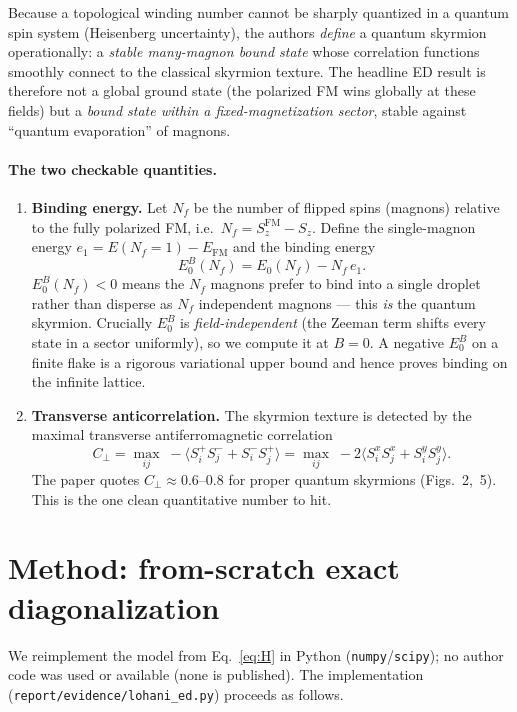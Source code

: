 \documentclass[11pt]{article}
\newcommand{\Cperp}{C_{\perp}}
\begin{document}
Because a topological winding number cannot be sharply quantized in a quantum spin system
(Heisenberg uncertainty), the authors \emph{define} a quantum skyrmion operationally: a
\emph{stable many-magnon bound state} whose correlation functions smoothly connect to the classical
skyrmion texture. The headline ED result is therefore not a global ground state (the polarized FM
wins globally at these fields) but a \emph{bound state within a fixed-magnetization sector},
stable against ``quantum evaporation'' of magnons.

\paragraph{The two checkable quantities.}
\begin{enumerate}
\item \textbf{Binding energy.} Let $N_f$ be the number of flipped spins (magnons) relative to the
fully polarized FM, i.e.\ $N_f = S_z^{\mathrm{FM}} - S_z$. Define the single-magnon energy
$e_1 = E(N_f{=}1) - E_{\mathrm{FM}}$ and the binding energy
\begin{equation}
E_0^B(N_f) = E_0(N_f) - N_f\, e_1 .
\label{eq:binding}
\end{equation}
$E_0^B(N_f)<0$ means the $N_f$ magnons prefer to bind into a single droplet rather than disperse
as $N_f$ independent magnons --- this \emph{is} the quantum skyrmion. Crucially $E_0^B$ is
\emph{field-independent} (the Zeeman term shifts every state in a sector uniformly), so we compute
it at $B=0$. A negative $E_0^B$ on a finite flake is a rigorous variational upper bound and hence
proves binding on the infinite lattice.
\item \textbf{Transverse anticorrelation.} The skyrmion texture is detected by the maximal
transverse antiferromagnetic correlation
\begin{equation}
\Cperp = \max_{ij}\; -\big\langle S_i^+ S_j^- + S_i^- S_j^+\big\rangle
       = \max_{ij}\; -2\big\langle S_i^x S_j^x + S_i^y S_j^y\big\rangle .
\label{eq:cperp}
\end{equation}
The paper quotes $\Cperp \approx 0.6$--$0.8$ for proper quantum skyrmions (Figs.~2,~5). This is the
one clean quantitative number to hit.
\end{enumerate}

\section{Method: from-scratch exact diagonalization}
We reimplement the model from Eq.~\eqref{eq:H} in Python (\texttt{numpy}/\texttt{scipy}); no author
code was used or available (none is published). The implementation
(\texttt{report/evidence/lohani\_ed.py}) proceeds as follows.
\end{document}
